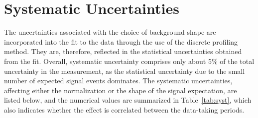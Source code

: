 \chapter{Systematic Uncertainties}\label{sec:uncertainties}

The uncertainties associated with the choice of background shape are incorporated into the fit to the data through the use of the discrete profiling method.
They are, therefore, reflected in the statistical uncertainties obtained from the fit.
 Overall, systematic uncertainty comprises only about 5\% of the total uncertainty in the measurement, as the statistical uncertainty due to the small number of expected signal events dominates. The systematic uncertainties, affecting either the normalization or the shape of the signal expectation, are listed below, and the numerical values are summarized in Table~\ref{tab:syst}, which also indicates whether the effect is correlated between the data-taking periods.
